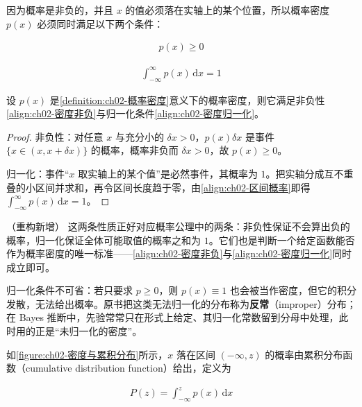 \documentclass[../../main.tex]{subfiles}
\begin{document}
因为概率是非负的，并且 $x$ 的值必须落在实轴上的某个位置，所以概率密度 $p(x)$ 必须同时满足以下两个条件：

\begin{align}
  p(x) \geqslant 0
  \label{align:ch02-密度非负}
\end{align}

\begin{align}
  \int_{-\infty}^{\infty} p(x)\,\mathrm{d}x = 1
  \label{align:ch02-密度归一化}
\end{align}

\begin{proposition}[概率密度的两个基本性质]\label{proposition:ch02-密度性质}
设 $p(x)$ 是\cref{definition:ch02-概率密度}意义下的概率密度，则它满足非负性\eqref{align:ch02-密度非负}与归一化条件\eqref{align:ch02-密度归一化}。
\end{proposition}

\begin{proof}
非负性：对任意 $x$ 与充分小的 $\delta x>0$，$p(x)\delta x$ 是事件 $\{x\in(x,x+\delta x)\}$ 的概率，概率非负而 $\delta x>0$，故 $p(x)\geqslant0$。

归一化：事件“$x$ 取实轴上的某个值”是必然事件，其概率为 $1$。把实轴分成互不重叠的小区间并求和，再令区间长度趋于零，由\eqref{align:ch02-区间概率}即得 $\int_{-\infty}^{\infty}p(x)\,\mathrm{d}x=1$。
\end{proof}

\begin{remark}（重构新增）
这两条性质正好对应概率公理中的两条：非负性保证不会算出负的概率，归一化保证全体可能取值的概率之和为 $1$。它们也是判断一个给定函数能否作为概率密度的唯一标准——\eqref{align:ch02-密度非负}与\eqref{align:ch02-密度归一化}同时成立即可。

归一化条件不可省：若只要求 $p\geqslant0$，则 $p(x)\equiv1$ 也会被当作密度，但它的积分发散，无法给出概率。原书把这类无法归一化的分布称为\textbf{反常}（improper）分布；在 Bayes 推断中，先验常常只在形式上给定、其归一化常数留到分母中处理，此时用的正是“未归一化的密度”。
\end{remark}

如\cref{figure:ch02-密度与累积分布}所示，$x$ 落在区间 $(-\infty,z)$ 的概率由累积分布函数（cumulative distribution function）给出，定义为

\begin{align}
  P(z) = \int_{-\infty}^{z} p(x)\,\mathrm{d}x
  \label{align:ch02-累积分布}
\end{align}
\end{document}
